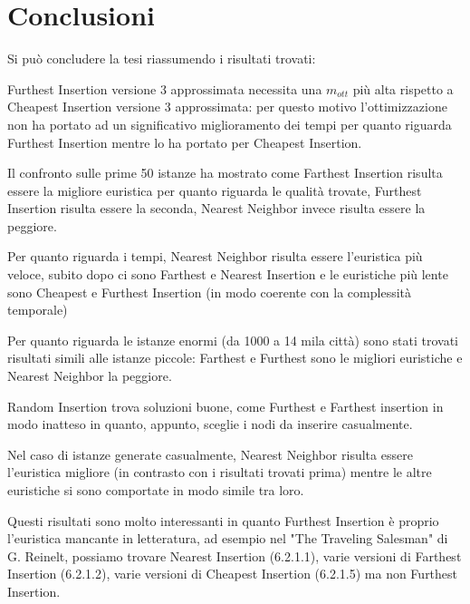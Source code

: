 \documentclass[a4paper,12pt]{report}
\begin{document}
\chapter{Conclusioni}
Si può concludere la tesi riassumendo i risultati trovati:
\begin{legal}
  \item Furthest Insertion versione 3 approssimata necessita una $m_{ott}$ più alta rispetto a Cheapest Insertion versione 3 approssimata: per questo motivo l'ottimizzazione non ha portato ad un significativo miglioramento dei tempi per quanto riguarda Furthest Insertion mentre lo ha portato per Cheapest Insertion.
  \item Il confronto sulle prime 50 istanze ha mostrato come Farthest Insertion risulta essere la migliore euristica per quanto riguarda le qualità trovate, Furthest Insertion risulta essere la seconda, Nearest Neighbor invece risulta essere la peggiore.
  \item Per quanto riguarda i tempi, Nearest Neighbor risulta essere l'euristica più veloce, subito dopo ci sono Farthest e Nearest Insertion e le euristiche più lente sono Cheapest e Furthest Insertion (in modo coerente con la complessità temporale)
  \item Per quanto riguarda le istanze enormi (da 1000 a 14 mila città) sono stati trovati risultati simili alle istanze piccole: Farthest e Furthest sono le migliori euristiche e Nearest Neighbor la peggiore.
  \item Random Insertion trova soluzioni buone, come Furthest e Farthest insertion in modo inatteso in quanto, appunto, sceglie i nodi da inserire casualmente.
  \item Nel caso di istanze generate casualmente, Nearest Neighbor risulta essere l'euristica migliore (in contrasto con i risultati trovati prima) mentre le altre euristiche si sono comportate in modo simile tra loro.
\end{legal}
Questi risultati sono molto interessanti in quanto Furthest Insertion è proprio l'euristica mancante in letteratura, ad esempio nel "The Traveling Salesman" di G. Reinelt\cite{Reinelt}, possiamo trovare Nearest Insertion (6.2.1.1), varie versioni di Farthest Insertion (6.2.1.2), varie versioni di Cheapest Insertion (6.2.1.5) ma non Furthest Insertion.
\end{document}
